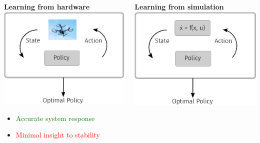 \begin{frame}
    \begin{columns}
        \begin{column}[t]{0.48\linewidth}
            \textbf{Learning from hardware}
            \includegraphics[]{./figures/unknown__env.eps}
            \begin{itemize}
                \item \textcolor{green}{Accurate system response}
                \item \textcolor{red}{Minimal insight to stability}
            \end{itemize}  
        \end{column}
        \begin{column}[t]{0.48\linewidth}
            \textbf{Learning from simulation}
            \vspace{0.5em}\includegraphics[]{./figures/nominal_model.eps}  

\end{column}
\end{columns}
\end{frame}
